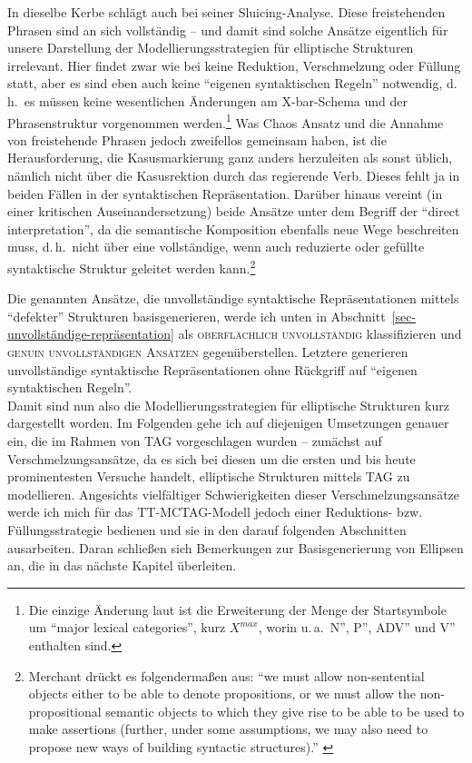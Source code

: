 In dieselbe Kerbe schlägt auch \citet[233ff]{Riemsdijk:78} bei seiner Sluicing-Analyse. Diese freistehenden Phrasen sind an sich vollständig -- und damit sind solche Ansätze eigentlich für unsere Darstellung der Modellierungsstrategien für elliptische Strukturen irrelevant. Hier findet zwar wie bei \cite{Chao:87} keine Reduktion, Verschmelzung oder Füllung statt, aber es sind eben auch keine "`eigenen syntaktischen Regeln"' notwendig, d.\,h.\ es müssen keine wesentlichen Änderungen am X-bar-Schema und der Phrasenstruktur vorgenommen werden.\footnote{Die einzige Änderung laut \citet[53ff]{Barton:90} ist die Erweiterung der Menge der Startsymbole um "`major lexical categories"', kurz $X^{max}$, worin u.\,a.\ N'', P'', ADV'' und V'' enthalten sind.} Was Chaos Ansatz und die Annahme von freistehende Phrasen jedoch zweifellos gemeinsam haben, ist die Herausforderung, die Kasusmarkierung ganz anders herzuleiten als sonst üblich, nämlich nicht über die Kasusrektion durch das regierende Verb. Dieses fehlt ja in beiden Fällen in der syntaktischen Repräsentation. Darüber hinaus vereint \cite{Merchant:04} (in einer kritischen Auseinandersetzung) beide Ansätze unter dem Begriff der "`direct interpretation"', da die semantische Komposition ebenfalls neue Wege beschreiten muss, d.\,h.\ nicht über eine vollständige, wenn auch reduzierte oder gefüllte syntaktische Struktur geleitet werden kann.\footnote{Merchant drückt es folgenderma\ss en aus: "`we must allow non-sentential objects either to be able to denote propositions, or we must allow the non-propositional semantic objects to which they give rise to be able to be used to make assertions (further, under some assumptions, we may also need to propose new ways of building syntactic structures)."' \citep[662]{Merchant:04}} 

Die genannten Ansätze, die unvollständige syntaktische Repräsentationen mittels "`defekter"' Strukturen basisgenerieren, werde ich unten in Abschnitt~\ref{sec-unvollständige-repräsentation} als \textsc{oberflächlich unvollständig} klassifizieren und \textsc{genuin unvollständigen Ansätzen} gegenüberstellen. Letztere generieren unvollständige syntaktische Repräsentationen ohne Rückgriff auf "`eigenen syntaktischen Regeln"'. \\


Damit sind nun also die Modellierungsstrategien für elliptische Strukturen kurz dargestellt worden. Im Folgenden gehe ich auf diejenigen Umsetzungen genauer ein, die im Rahmen von TAG vorgeschlagen wurden -- zunächst auf Verschmelzungsansätze, da es sich bei diesen um die ersten und bis heute prominentesten Versuche handelt, elliptische Strukturen mittels TAG zu modellieren. Angesichts vielfältiger Schwierigkeiten dieser Verschmelzungsansätze werde ich mich für das TT-MCTAG-Modell jedoch einer Reduktions- bzw. Füllungsstrategie bedienen und sie in den darauf folgenden Abschnitten ausarbeiten. Daran schlie\ss en sich Bemerkungen zur Basisgenerierung von Ellipsen an, die in das nächste Kapitel überleiten.    



